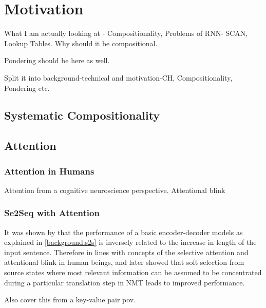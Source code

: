 \chapter{Motivation} \label{Chapter:motivation}

What I am actually looking at -  Compositionality, Problems of RNN- SCAN, Lookup Tables. Why should it be compositional.

Pondering should be here as well.

Split it into background-technical and motivation-CH, Compositionality, Pondering etc.

\section{Systematic Compositionality}

\section{Attention}

\subsection{Attention in Humans}
Attention from a cognitive neuroscience perspective. Attentional blink

\subsection{Se2Seq with Attention}
It was shown by \cite{Cho2014} that the performance of a basic encoder-decoder models as explained in \ref{background:s2s} is inversely related to the increase in length of the input sentence. Therefore in lines with concepts of the selective attention and attentional blink in human beings, \cite{Bahdanau2014} and later  \cite{Luong2015} showed that soft selection from source states where most relevant information can be assumed to be concentrated during a particular translation step in NMT leads to improved performance.

Also cover this from a key-value pair pov.


